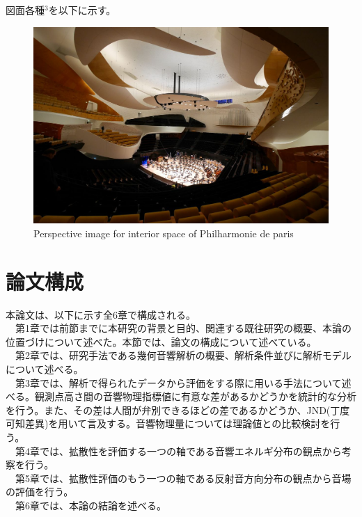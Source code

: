 図面各種$^3$を以下に示す。
\begin{figure}[htbp]
    \centering
    \includegraphics[keepaspectratio,scale=0.2]{01_att/pic_in1.png}
    \caption{\hspace{1mm}Perspective image for interior space of Philharmonie de paris}
    \label{fig:pic_in1}
\end{figure}


\addtocounter{footnote}{1}
\addtocounter{footnote}{1}
\addtocounter{footnote}{1}


\pagebreak
\section{論文構成}
本論文は、以下に示す全6章で構成される。
\\　第1章では前節までに本研究の背景と目的、関連する既往研究の概要、本論の位置づけについて述べた。本節では、論文の構成について述べている。
\\　第2章では、研究手法である幾何音響解析の概要、解析条件並びに解析モデルについて述べる。
\\　第3章では、解析で得られたデータから評価をする際に用いる手法について述べる。観測点高さ間の音響物理指標値に有意な差があるかどうかを統計的な分析を行う。また、その差は人間が弁別できるほどの差であるかどうか、JND(丁度可知差異)を用いて言及する。音響物理量については理論値との比較検討を行う。
\\　第4章では、拡散性を評価する一つの軸である音響エネルギ分布の観点から考察を行う。
\\　第5章では、拡散性評価のもう一つの軸である反射音方向分布の観点から音場の評価を行う。
\\　第6章では、本論の結論を述べる。